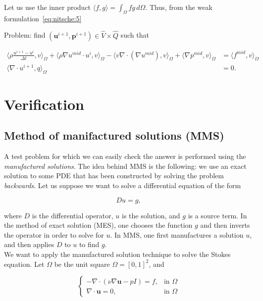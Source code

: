 \documentclass[11pt,a4paper,titlepage]{report}
\begin{document}
Let us use the inner product $\langle f,g \rangle = \int_{\Omega} fg \, d\Omega$. Thus, from the weak formulation~\eqref{eq:nitsche:5}

Problem: find $(\mathbf{u}^{i+1}, \mathbf{p}^{i+1}) \in \hat{V} \times \hat{Q}$ such that

\begin{align}
\langle \rho \frac{u^{i+1} - u^i}{\Delta t},v \rangle_\Omega
+ \langle \rho \nabla u^{mid} \cdot u^i  ,v \rangle_\Omega
- \langle v \nabla \cdot (\nabla u^{mid}) ,v \rangle_\Omega
+ \langle \nabla p^{mid} ,v \rangle_\Omega & = \langle f^{mid} ,v \rangle_\Omega \\
\langle \nabla \cdot u^{i+1},q \rangle_\Omega &=0 .
\end{align}



\chapter{Verification}

\section{Method of manifactured solutions (MMS)}

A test problem for which we can easily check the answer is performed using the \textit{manufactured solutions}. The idea behind MMS is the following: we use an exact solution to some PDE that has been constructed by solving the problem \textit{backwards}. Let us suppose we want to solve a differential equation of the form

\[
Du = g,
\]

where $D$ is the differential operator, $u$ is the solution, and $g$ is a source term. In the method of exact solution (MES), one chooses the function $g$ and then inverts the operator in order to solve for $u$. In MMS, one first manufactures a solution $u$, and then applies $D$ to $u$ to find $g$. \\

We want to apply the manufactured solution technique to solve the Stokes equation. Let $\Omega$ be the unit square $\Omega = [0,1]^2$, and

\vspace{0.2cm}
\[
\begin{cases}
- \nabla \cdot (\nu \nabla \mathbf{u} - pI) = f, & \mbox{in } \Omega \\
\nabla \cdot \mathbf{u} = 0, & \mbox{in } \Omega
\end{cases}
\]
\vspace{0.2cm}
\end{document}
